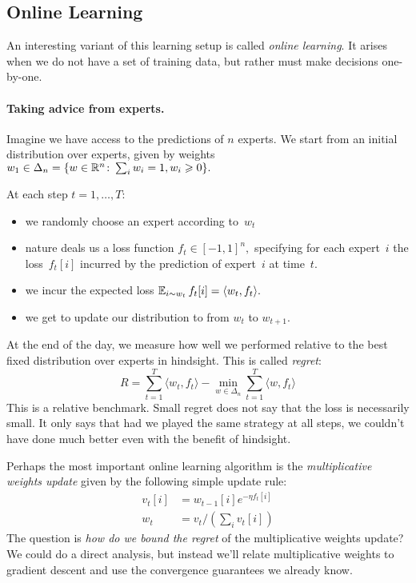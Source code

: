 \subsection{Online Learning}

An interesting variant of this learning setup is called \emph{online learning}.
It arises when we do not have a set of training data, but rather must make
decisions one-by-one.

\paragraph{Taking advice from experts.}
Imagine we have access to the predictions of $n$ experts. 
We start from an initial distribution over experts, given by
weights~$w_1\in\Delta_n = \{ w\in\mathbb{R}^n\colon \sum_i w_i=1, w_i\geqslant0\}.$

At each step $t = 1, \ldots, T$:
\begin{itemize}
    \item we randomly choose an expert according to~$w_t$
    \item nature deals us a loss function $f_t\in[-1,1]^n,$ specifying for each
expert~$i$ the loss~$f_t[i]$ incurred by the prediction of expert~$i$ at
time~$t.$
    \item we incur the expected loss $\operatorname*{\mathbb{E}}_{i\sim w_t}f_t[i]=\langle
w_t,f_t\rangle.$
    \item we get to update our distribution to from $w_t$ to $w_{t+1}.$
\end{itemize}

At the end of the day, we measure how well we performed relative to the best
fixed distribution over experts in hindsight. This is called \emph{regret}:
\begin{equation*}
   R = \sum^T_{t = 1} \langle w_{t}, f_t \rangle - \min_{w \in \Delta_n} \sum^{T}_{t = 1} \langle w, f_t \rangle
\end{equation*}
This is a relative benchmark. Small regret does not say that the loss is necessarily
small. It only says that had we played the same strategy at all steps, we
couldn't have done much better even with the benefit of hindsight.

Perhaps the most important online learning algorithm is the \emph{multiplicative
weights update} given by the following simple update rule:
\begin{align*}
    v_t[i] &= w_{t-1}[i]e^{-\eta f_t[i]} \tag{exponential weights update}\\
    w_t &= v_t/(\textstyle\sum_i v_t[i]) \tag{normalize}
\end{align*}
The question is \textit{how do we bound the regret} of the multiplicative
weights update? We could do a direct analysis, but instead we'll relate
multiplicative weights to gradient descent and use the convergence guarantees
we already know.

